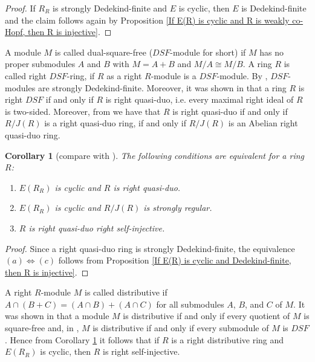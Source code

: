 \documentclass{amsart}
\theoremstyle{plain}
\newtheorem{corollary}[theorem]{Corollary}
\numberwithin{equation}{section}
\begin{document}
\begin{proof}
If $R_{R}$ is strongly Dedekind-finite and $E$ is cyclic, then $E$ is Dedekind-finite and the claim follows again by Proposition \ref{If E(R) is cyclic and R is weakly co-Hopf, then R is injective}. 
\end{proof}

A module $M$ is called  {dual-square-free} \textrm{(}$D S F$-module for short\textrm{)} if $M$ has no proper submodules $A$ and $B$ with $M =A +B$ and $M/A \cong M/B$. A ring $R$ is called right $D S F$-ring, if $R$ as a right $R$-module is a $D S F$-module. By \cite[Proposition 2.3 and Lemma
3.1]{IY 2}, $D S F$-modules are strongly Dedekind-finite. Moreover, it was shown in \cite[Corollary 2.17]{IY 2}
that a ring $R$ is right $D S F$ if and only if $R$ is  {right quasi-duo}, i.e. every maximal right ideal of $R$ is two-sided. Moreover, from \cite{Y} we have that
$R$ is right quasi-duo if and only if $R/J (R)$ is a right quasi-duo ring, if and only if $R/J (R)$ is an Abelian right quasi-duo ring. 


\begin{corollary}[{compare with \cite[Proposition 3.8]{IY 5}}]
\label{If E(R) is cyclic and DSF then R is self-inj}
\label{E(R) cyclic implies Injective VI} The following conditions are equivalent
for a ring $R$: 


\begin{enumerate}
\item [(a)] $E (R_{R})$ is cyclic and $R$ is right quasi-duo. 

\item [(b)] $E (R_{R})$ is cyclic and $R/J (R)$ is strongly regular. 

\item [(c)] $R$ is right quasi-duo right self-injective. \end{enumerate}
\end{corollary}


\begin{proof}
Since a right quasi-duo ring is strongly Dedekind-finite, the equivalence $(a) \Leftrightarrow (c)$ follows from Proposition \ref{If E(R) is cyclic and Dedekind-finite, then R is injective}.
\end{proof}

A right $R$-module $M$ is called  {distributive} if $A \cap (B +C) =(A \cap B) +(A \cap C)$ for all submodules $A$, $B$, and $C$ of $M$. It was shown in \cite{S} that a module $M$ is distributive if and only if every quotient of $M$ is square-free and, in \cite[Lemma 2.2]{IY 6},
$M$ is distributive if and only if every submodule of $M$ is $D S F$. Hence from Corollary \ref{If E(R) is cyclic and DSF then R is self-inj}
it follows that if $R$ is a right distributive ring and $E (R_{R})$ is cyclic, then $R$ is right self-injective. 
\end{document}
